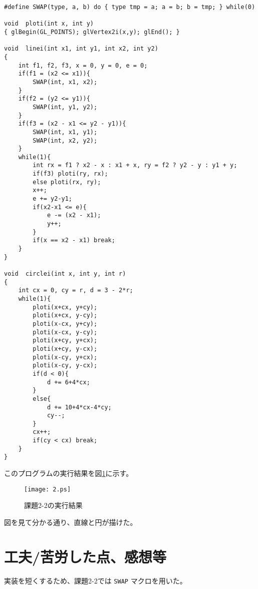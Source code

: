 \documentclass[titlepage]{jsarticle}
\begin{document}
\begin{lstlisting}[style=program, label=list:impl2, caption=課題2-2のソースコード]
#define SWAP(type, a, b) do { type tmp = a; a = b; b = tmp; } while(0)

void  ploti(int x, int y)
{ glBegin(GL_POINTS); glVertex2i(x,y); glEnd(); }

void  linei(int x1, int y1, int x2, int y2)
{
    int f1, f2, f3, x = 0, y = 0, e = 0;
    if(f1 = (x2 <= x1)){
        SWAP(int, x1, x2);
    }
    if(f2 = (y2 <= y1)){
        SWAP(int, y1, y2);
    }
    if(f3 = (x2 - x1 <= y2 - y1)){
        SWAP(int, x1, y1);
        SWAP(int, x2, y2);
    }
    while(1){
        int rx = f1 ? x2 - x : x1 + x, ry = f2 ? y2 - y : y1 + y;
        if(f3) ploti(ry, rx);
        else ploti(rx, ry);
        x++;
        e += y2-y1;
        if(x2-x1 <= e){
            e -= (x2 - x1);
            y++;
        }
        if(x == x2 - x1) break;
    }
}

void  circlei(int x, int y, int r)
{
    int cx = 0, cy = r, d = 3 - 2*r;
    while(1){
        ploti(x+cx, y+cy);
        ploti(x+cx, y-cy);
        ploti(x-cx, y+cy);
        ploti(x-cx, y-cy);
        ploti(x+cy, y+cx);
        ploti(x+cy, y-cx);
        ploti(x-cy, y+cx);
        ploti(x-cy, y-cx);
        if(d < 0){
            d += 6+4*cx;
        }
        else{
            d += 10+4*cx-4*cy;
            cy--;
        }
        cx++;
        if(cy < cx) break;
    }
}
\end{lstlisting}

このプログラムの実行結果を図\ref{fig:output2}に示す。

\begin{figure}[htbp]
\begin{center}
\texttt{[image: 2.ps]}
\end{center}
\caption{課題2-2の実行結果}
\label{fig:output2}
\end{figure}

図を見て分かる通り、直線と円が描けた。

\section{工夫/苦労した点、感想等}

実装を短くするため、課題2-2では \texttt{SWAP} マクロを用いた。
\end{document}
